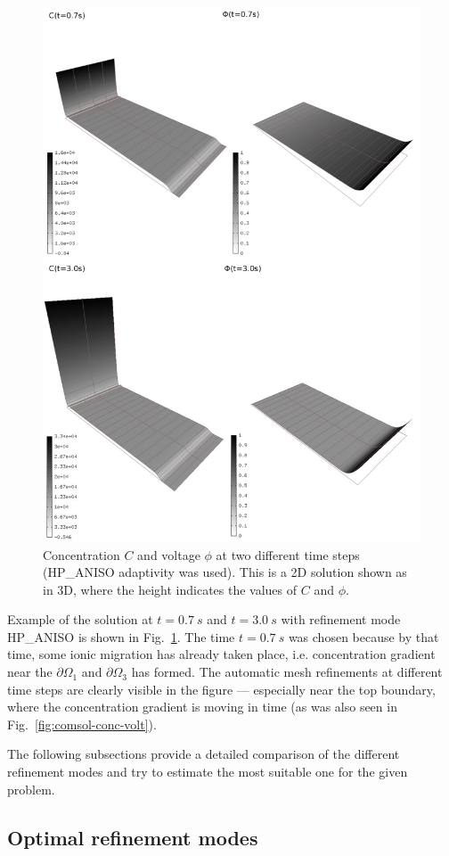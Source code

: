 \begin{figure}
  \begin{centering}
  \includegraphics[width=.75\columnwidth]{cphi}
  \caption{\label{fig:cphi} Concentration $C$
  and voltage $\phi$ at two different time steps
  (HP\_ANISO adaptivity was used). This is a 2D solution shown
  as in 3D, where the height indicates the values of $C$ and $\phi$.}
  \end{centering}
\end{figure}
Example of the solution at $t=0.7\ s$ and $t=3.0\ s$ 
with refinement mode HP\_ANISO is shown
in Fig.~\ref{fig:cphi}. The time $t=0.7\ s$ was chosen because
by that time, some ionic migration has already taken place, i.e.
concentration gradient near the $\partial\Omega_1$ and
$\partial\Omega_3$ has formed. The automatic mesh refinements
at different time steps are clearly visible in the figure --- especially
near the top boundary, where the concentration gradient is
moving in time (as was also seen in Fig.~\ref{fig:comsol-conc-volt}).

The following subsections provide a detailed comparison of
the different refinement modes and try to estimate the most suitable
one for the given problem.

\subsection{Optimal refinement modes}

